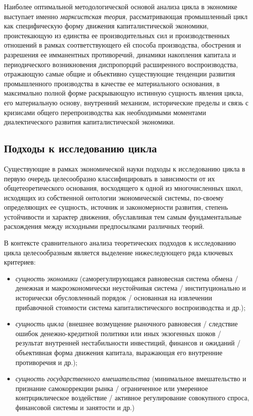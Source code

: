 Наиболее оптимальной методологической основой анализа цикла в экономике выступает именно \textit{марксистская теория}, рассматривающая промышленный цикл как специфическую форму движения капиталистической экономики, проистекающую из единства ее производительных сил и производственных отношений в рамках соответствующего ей способа производства, обострения и разрешения ее имманентных противоречий, динамики накопления капитала и периодического возникновения диспропорций расширенного воспроизводства, отражающую самые общие и объективно существующие тенденции развития промышленного производства в качестве ее материального основания, в максимально полной форме раскрывающую истинную сущность явления цикла, его материальную основу, внутренний механизм, исторические пределы и связь с кризисами общего перепроизводства как необходимыми моментами диалектического развития капиталистической экономики.

\subsection{Подходы к исследованию цикла}
Существующие в рамках экономической науки подходы к исследованию цикла в первую очередь целесообразно классифицировать в зависимости от их общетеоретического основания, восходящего к одной из многочисленных школ, исходящих из собственной онтологии экономической системы, по-своему определяющих ее сущность, источник и закономерности развития, степень устойчивости и характер движения, обуславливая тем самым фундаментальные расхождения между исходными предпосылками различных теорий.

В контексте сравнительного анализа теоретических подходов к исследованию цикла целесообразным является выделение нижеследующего ряда ключевых критериев:
\begin{itemize}
    \item \textit{сущность экономики} (саморегулирующаяся равновесная система обмена / денежная и макроэкономически неустойчивая система / институционально и исторически обусловленный порядок / основанная на извлечении прибавочной стоимости система капиталистического воспроизводства и др.);
    \item \textit{сущность цикла} (внешнее возмущение рыночного равновесия / следствие ошибок денежно-кредитной политики или иных экзогенных шоков / результат внутренней нестабильности инвестиций, финансов и ожиданий / объективная форма движения капитала, выражающая его внутренние противоречия и др.);
    \item \textit{сущность государственного вмешательства} (минимальное вмешательство и признание самокоррекции рынка / ограниченное или умеренное контрциклическое воздействие / активное регулирование совокупного спроса, финансовой системы и занятости и др.)
\end{itemize}

